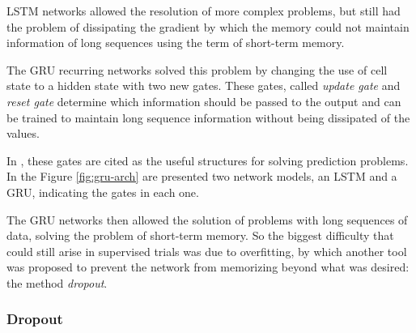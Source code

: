     LSTM networks allowed the resolution of more complex problems, but still had the problem of dissipating the gradient by which the memory could not maintain information of long sequences using the term of short-term memory.
    
    The GRU recurring networks solved this problem by changing the use of cell state to a hidden state with two new gates. These gates, called \textit{update gate} and \textit{reset gate} determine which information should be passed to the output and can be trained to maintain long sequence information without being dissipated of the values. 
    
    In \cite{DLB}, these gates are cited as the useful structures for solving prediction problems. In the Figure \ref{fig:gru-arch} are presented two network models, an LSTM and a GRU, indicating the gates in each one. 
         	
    \begin{figure}[ht]
    \end{figure}
    
    The GRU networks then allowed the solution of problems with long sequences of data, solving the problem of short-term memory. So the biggest difficulty that could still arise in supervised trials was due to overfitting, by which another tool was proposed to prevent the network from memorizing beyond what was desired: the method \textit{dropout}.
    
    \subsubsection{Dropout} \label{sec:drop_fund}
    
